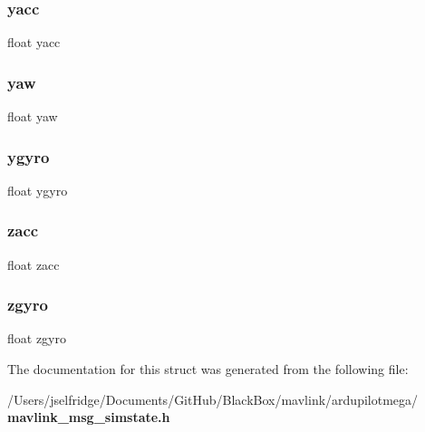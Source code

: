 \subsubsection{yacc}
{\footnotesize\ttfamily float yacc}

\mbox{\label{struct____mavlink__simstate__t_a7efc219781df4a1e281cb5d348b7fbf9}} 
\subsubsection{yaw}
{\footnotesize\ttfamily float yaw}

\mbox{\label{struct____mavlink__simstate__t_af48026fec41d03cdc46d6aa15f65efbe}} 
\subsubsection{ygyro}
{\footnotesize\ttfamily float ygyro}

\mbox{\label{struct____mavlink__simstate__t_a1e5ff812e6635e86691827727fc12e43}} 
\subsubsection{zacc}
{\footnotesize\ttfamily float zacc}

\mbox{\label{struct____mavlink__simstate__t_ae814e88c0e12f476071cc8c9dd95a697}} 
\subsubsection{zgyro}
{\footnotesize\ttfamily float zgyro}



The documentation for this struct was generated from the following file\+:\begin{DoxyCompactItemize}
\item 
/\+Users/jselfridge/\+Documents/\+Git\+Hub/\+Black\+Box/mavlink/ardupilotmega/\textbf{ mavlink\+\_\+msg\+\_\+simstate.\+h}\end{DoxyCompactItemize}
